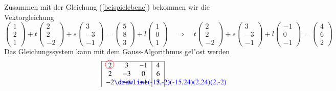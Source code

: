 \begin{beispiel}
{\parindent0pt Zusammen} mit der Gleichung (\ref{beispielebene}) bekommen wir die
Vektorgleichung
\[
\begin{pmatrix}1\\2\\1 \end{pmatrix}
+
t\begin{pmatrix}2\\2\\-2\end{pmatrix}
+
s\begin{pmatrix}3\\-3\\-1\end{pmatrix}
=
\begin{pmatrix} 5\\8\\3 \end{pmatrix}
+
l\begin{pmatrix} 1\\0\\1 \end{pmatrix}
\quad\Rightarrow\quad
t\begin{pmatrix}2\\2\\-2\end{pmatrix}
+
s\begin{pmatrix}3\\-3\\-1\end{pmatrix}
+
l\begin{pmatrix} -1\\0\\-1 \end{pmatrix}
=
\begin{pmatrix} 4\\6\\2 \end{pmatrix}
\]
Das Gleichungssystem kann mit dem Gauss-Algorithmus
gel"ost werden
\begin{align*}
\begin{tabular}{|>{$}c<{$}>{$}c<{$}>{$}c<{$}|>{$}c<{$}|}
\hline
 2%
\begin{picture}(0,0)
\color{red}\put(-3,4){\circle{12}}
\end{picture}%
& 3&-1&4\\
 2&-3& 0&6\\
-2%
\begin{picture}(0,0)
\color{blue}\drawline(-15,-2)(-15,24)(2,24)(2,-2)
\end{picture}
&-1&-1&2\\

\end{tabular}
\end{align*}
\end{beispiel}
